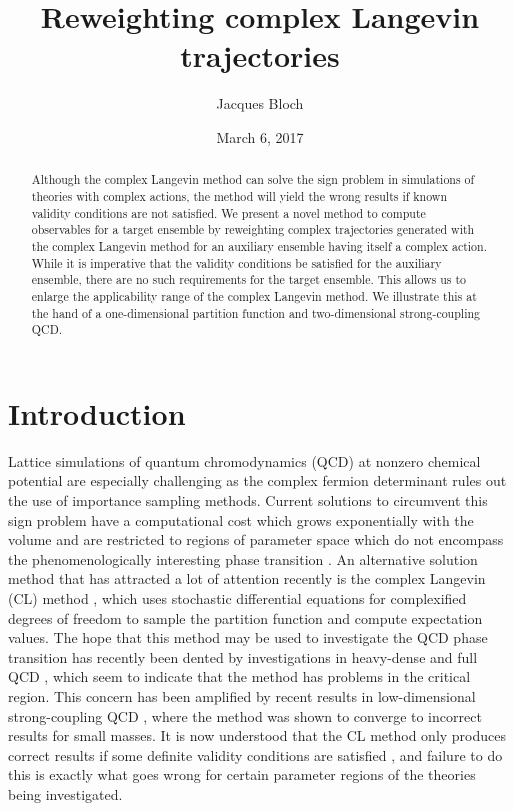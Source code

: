 \documentclass[prd,showpacs,reprint,nofootinbib,showkeys]{revtex4-1}
\begin{document}
\title{Reweighting complex Langevin trajectories}

\author{Jacques Bloch}

\date{March 6, 2017}

\begin{abstract}
Although the complex Langevin method can solve the sign problem in simulations of theories with complex actions, the method will yield the wrong results if known validity conditions are not satisfied. We present a novel method to compute observables for a target ensemble by reweighting complex trajectories generated with the complex Langevin method for an auxiliary ensemble having itself a complex action. While it is imperative that the validity conditions be satisfied for the auxiliary ensemble, there are no such requirements for the target ensemble. This allows us to enlarge the applicability range of the complex Langevin method. We illustrate this at the hand of a one-dimensional partition function and two-dimensional strong-coupling QCD.
\end{abstract}



\maketitle

\section{Introduction}

Lattice simulations of quantum chromodynamics (QCD) at nonzero chemical potential are especially challenging as the complex fermion determinant rules out the use of importance sampling methods. Current solutions to circumvent this sign problem have a computational cost which grows exponentially with the volume and are restricted to regions of parameter space which do not encompass the phenomenologically interesting phase transition \cite{Fodor:2015doa}. An alternative solution method that has attracted a lot of attention recently is the complex Langevin (CL) method \cite{Parisi:1984cs,Aarts:2013uxa}, which uses stochastic differential equations for complexified degrees of freedom to sample the partition function and compute expectation values. The hope that this method may be used to investigate the QCD phase transition has recently been dented by investigations in heavy-dense \cite{Sexty:2013ica} and full QCD \cite{Fodor:2015doa}, which seem to indicate that the method has problems in the critical region. This concern has been amplified by recent results in low-dimensional strong-coupling QCD \cite{Bloch:2015coa}, where the method was shown to converge to incorrect results for small masses. It is now understood that the CL method only produces correct results if some definite validity conditions are satisfied \cite{Aarts:2011ax,Nagata:2016vkn,Salcedo:2016kyy}, and failure to do this is exactly what goes wrong for certain parameter regions of the theories being investigated.
\end{document}
